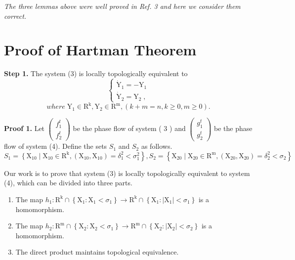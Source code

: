 \documentclass[11pt]{diazessay} %
\begin{document}
\vskip 8pt
\textit{The three lemmas above were well proved in Ref. 3 and here we consider them correct.}
\section*{Proof of Hartman Theorem}

\textbf{Step 1. } 
The system (3) is locally topologically equivalent to 
\begin{equation}
	\left\{\begin{array}{l}\dot{\mathrm{Y}}_1=-\mathrm{Y}_1 \\ \dot{\mathrm{Y}}_2=\mathrm{Y}_2 \;,\end{array}\right. 
\end{equation}
$$
where \;\mathrm{Y}_1 \in \mathrm{R}^{\mathrm{k}}, \mathrm{Y}_2 \in \mathrm{R}^{\mathrm{m}}, (k+m=n, k \geq 0, m \geq 0).$$

\vskip 8pt
\textbf{Proof 1. }
Let $\left(\begin{array}{l}f_1^t \\ f_2^{t}\end{array}\right)$ be the phase flow of system ( 3 ) and $\left(\begin{array}{l}g_1^t \\ g_2^{t}\end{array}\right)$  be the phase flow of system (4). Define the sets $S_1$ and $S_2$ as follows.
$$S_1=\left\{\mathrm{X}_{10} \mid \mathrm{X}_{10} \in\right.
\left.\mathrm{R}^{\mathrm{k}},\left(\mathrm{X}_{10}, \mathrm{X}_{10}\right)=\delta_1^2<\sigma_1^2\right\} , S_2=\left\{\mathrm{X}_{20} \mid \mathrm{X}_{20} \in \mathrm{R}^{\mathrm{m}},\left(\mathrm{X}_{20}, \mathrm{X}_{20}\right)=\delta_2^2<\sigma_2\right\} $$

\noindent
Our work is to prove that system (3) is locally topologically equivalent to system (4), which can be divided into three parts.

\begin{enumerate}
	\item The map $h_1: \mathrm{R}^{\mathrm{k}} \cap\left\{\mathrm{X}_1: \mathrm{X}_1<\sigma_1\right\} \rightarrow \mathrm{R}^{\mathrm{k}} \cap\left\{\mathrm{X}_1:\left|\mathrm{X}_1\right|<\sigma_1\right\}$ is a homomorphism.
	\item The map $	h_2: \mathrm{R}^{\mathrm{m}} \cap\left\{\mathrm{X}_2: \mathrm{X}_2<\sigma_1\right\} \rightarrow \mathrm{R}^{\mathrm{m}} \cap\left\{\mathrm{X}_2:\left|\mathrm{X}_2\right|<\sigma_2\right\}$ is a homomorphism.
	\item The direct product maintains topological equivalence.
\end{enumerate}
\end{document}
